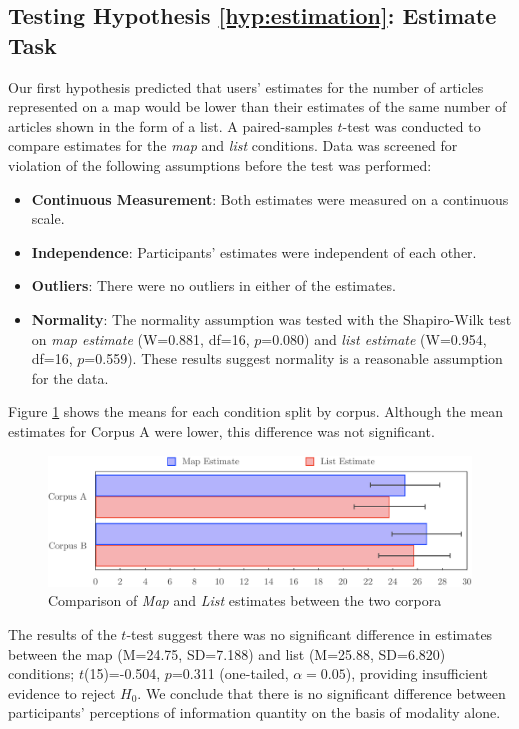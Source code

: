 \subsection{Testing Hypothesis \ref{hyp:estimation}: Estimate Task}

Our first hypothesis predicted that users' estimates for the number of articles represented on a map would be lower than their estimates of the same number of articles shown in the form of a list. A paired-samples $t$-test was conducted to compare estimates for the \textit{map} and \textit{list} conditions. Data was screened for violation of the following assumptions before the test was performed:
\vspace{-0.2cm}
\begin{itemize}[label={},itemsep=0.05em,leftmargin=0cm]
	\item \textbf{Continuous Measurement}: Both estimates were measured on a continuous scale.
	\item \textbf{Independence}: Participants' estimates were independent of each other.
	\item \textbf{Outliers}: There were no outliers in either of the estimates.
	\item \textbf{Normality}: The normality assumption was tested with the Shapiro-Wilk test on \textit{map estimate} (W=0.881, df=16, $p$=0.080) and \textit{list estimate}  (W=0.954, df=16, $p$=0.559). These results suggest normality is a reasonable assumption for the data.
\end{itemize}

Figure \ref{fig:estimate} shows the means for each condition split by corpus. Although the mean estimates for Corpus A were lower, this difference was not significant.

\begin{figure}[htbp!]
	\centering
	\includegraphics[width=\textwidth]{img/evaluation/estimate.pdf}
	\caption{Comparison of \textit{Map} and \textit{List} estimates between the two corpora}
	\label{fig:estimate}
\end{figure}

The results of the $t$-test suggest there was no significant difference in estimates between the map (M=24.75, SD=7.188) and list (M=25.88, SD=6.820) conditions; $t$(15)=-0.504, $p$=0.311 (one-tailed, $\alpha=0.05$), providing insufficient evidence to reject $H_0$. We conclude that there is no significant difference between participants' perceptions of information quantity on the basis of modality alone.

